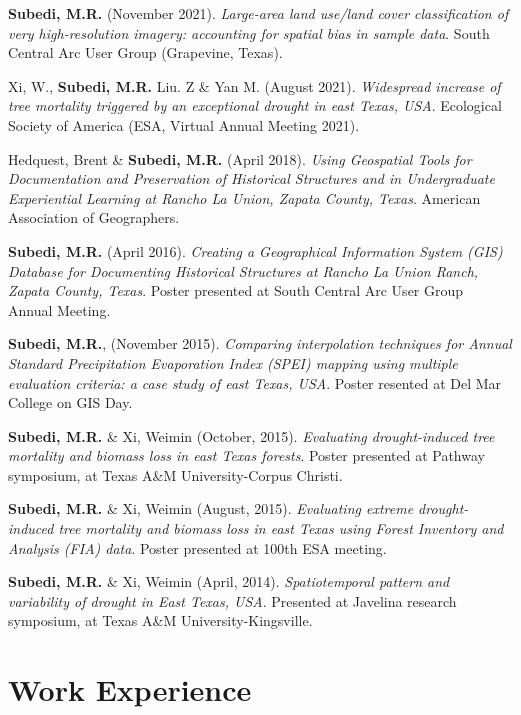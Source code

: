 \documentclass[11pt,a4paper,]{awesome-cv}
\begin{document}
\textbf{Subedi, M.R.} (November 2021). \emph{Large-area land use/land
cover classification of very high-resolution imagery: accounting for
spatial bias in sample data}. South Central Arc User Group (Grapevine,
Texas).

Xi, W., \textbf{Subedi, M.R.} Liu. Z \& Yan M. (August 2021).
\emph{Widespread increase of tree mortality triggered by an exceptional
drought in east Texas, USA}. Ecological Society of America (ESA, Virtual
Annual Meeting 2021).

Hedquest, Brent \& \textbf{Subedi, M.R.} (April 2018). \emph{Using
Geospatial Tools for Documentation and Preservation of Historical
Structures and in Undergraduate Experiential Learning at Rancho La
Union, Zapata County, Texas}. American Association of Geographers.

\textbf{Subedi, M.R.} (April 2016). \emph{Creating a Geographical
Information System (GIS) Database for Documenting Historical Structures
at Rancho La Union Ranch, Zapata County, Texas}. Poster presented at
South Central Arc User Group Annual Meeting.

\textbf{Subedi, M.R.}, (November 2015). \emph{Comparing interpolation
techniques for Annual Standard Precipitation Evaporation Index (SPEI)
mapping using multiple evaluation criteria: a case study of east Texas,
USA}. Poster resented at Del Mar College on GIS Day.

\textbf{Subedi, M.R.} \& Xi, Weimin (October, 2015). \emph{Evaluating
drought-induced tree mortality and biomass loss in east Texas forests}.
Poster presented at Pathway symposium, at Texas A\&M University-Corpus
Christi.

\textbf{Subedi, M.R.} \& Xi, Weimin (August, 2015). \emph{Evaluating
extreme drought-induced tree mortality and biomass loss in east Texas
using Forest Inventory and Analysis (FIA) data}. Poster presented at
100th ESA meeting.

\textbf{Subedi, M.R.} \& Xi, Weimin (April, 2014). \emph{Spatiotemporal
pattern and variability of drought in East Texas, USA}. Presented at
Javelina research symposium, at Texas A\&M University-Kingsville.

\section{Work Experience}\label{work-experience}
\end{document}
